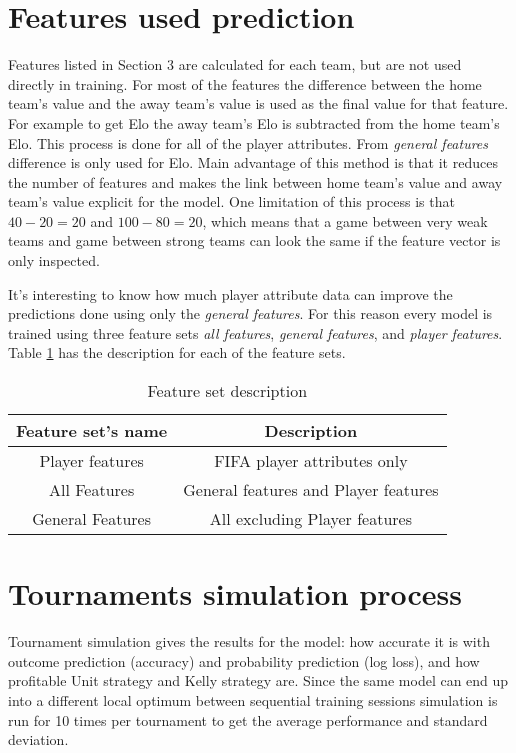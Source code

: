 \section{Features used prediction}
Features listed in Section 3 are calculated for each team, but are not used directly in training. For most of the features the difference between the home team's value and the away team's value is used as the final value for that feature. For example to get Elo the away team's Elo is subtracted from the home team's Elo. This process is done for all of the player attributes. From \textit{general features} difference is only used for Elo. Main advantage of this method is that it reduces the number of features and makes the link between home team's value and away team's value explicit for the model. One limitation of this process is that $40-20=20$ and $100-80=20$, which means that a game between very weak teams and game between strong teams can look the same if the feature vector is only inspected.

It's interesting to know how much player attribute data can improve the predictions done using only the \textit{general features}. For this reason every model is trained using three feature sets \textit{all features}, \textit{general features}, and \textit{player features}. Table \ref{table:featuresetlist} has the description for each of the feature sets.

\begin{table}
    \caption{Feature set description}
    \begin{tabular}{| c | c|}
        \hline
        Feature set's name & Description \\
        \hline
        Player features & FIFA player attributes only \\
        All Features & General features and Player features \\
        General Features & All excluding Player features \\
        \hline
    \end{tabular}
    \label{table:featuresetlist}
\end{table}

\section{Tournaments simulation process}
Tournament simulation gives the results for the model: how accurate it is with outcome prediction (accuracy) and probability prediction (log loss), and how profitable Unit strategy and Kelly strategy are. Since the same model can end up into a different local optimum between sequential training sessions simulation is run for 10 times per tournament to get the average performance and standard deviation.

